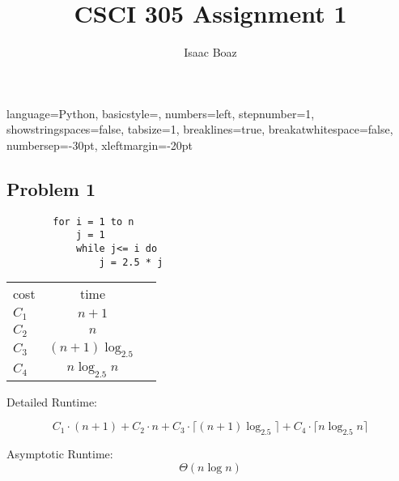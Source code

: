 \documentclass{article}
\title{CSCI 305 Assignment 1}
\author{Isaac Boaz}
\begin{document}
\maketitle

\lstset
{ %
    language=Python,
    basicstyle=\footnotesize,
    numbers=left,
    stepnumber=1,
    showstringspaces=false,
    tabsize=1,
    breaklines=true,
    breakatwhitespace=false,
    numbersep=-30pt,
    xleftmargin=-20pt
}
\setlength{\columnseprule}{0.1pt}

\subsection*{Problem 1}
\begin{multicols}{2}
    \begin{lstlisting}
        for i = 1 to n
            j = 1
            while j<= i do
                j = 2.5 * j
    \end{lstlisting}
    \columnbreak
    \footnotesize
    \begin{tabular}{lcc}
        cost  & time                 \\
        $C_1$ & $n + 1$              \\
        $C_2$ & $n$                  \\
        $C_3$ & $(n + 1) \log_{2.5}$ \\
        $C_4$ & $n \log_{2.5} n$
    \end{tabular}
\end{multicols}

Detailed Runtime:

\begin{equation*}
    C_1 \cdot (n + 1) + C_2 \cdot n + C_3 \cdot \lceil (n+1) \log_{2.5} \rceil + C_4 \cdot \lceil n \log_{2.5}n \rceil
\end{equation*}

Asymptotic Runtime:
\begin{equation*}
    \Theta(n \log n)
\end{equation*}
\end{document}
